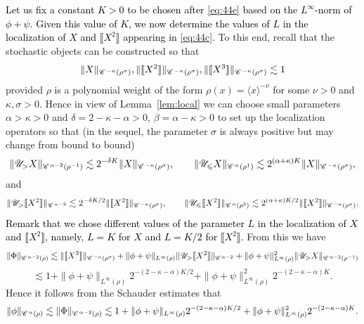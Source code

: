 \documentclass[a4paper,11pt]{article}
\numberwithin{equation}{section}
\newcommand{\CC}{\mathscr{C} \hspace{.1em}}
\newcommand{\UU}{\mathscr{U}}
\newcommand{\rmbb}[1]{\textcolor{black}{#1}}
\newcommand{\8}{\infty}
\begin{document}
 \rmbb{Let us fix a constant $K>0$ to be chosen  after \eqref{eq:44e} based on the $L^{\infty}$-norm of $\phi+\psi$. Given this value of $K$, we  now determine the values of $L$ in the localization of $X$ and $\llbracket X^{2}\rrbracket$ appearing in \eqref{eq:44c}.}
To this end, recall that the stochastic objects can be constructed so that
$$
\|X\|_{\CC^{-\kappa}(\rho^\sigma)},\|\llbracket X^2 \rrbracket\|_{\CC^{-\kappa}(\rho^\sigma)},\|\llbracket X^3 \rrbracket\|_{\CC^{-\kappa}(\rho^\sigma)}\lesssim 1
$$
provided $\rho$ is a polynomial weight of the form $\rho(x)=\langle x\rangle^{-\nu}$ for some $\nu>0$ and $\kappa,\sigma>0$. 
Hence in view of Lemma~\ref{lem:local} we can choose small parameters $\alpha>\kappa>0$ and $\delta=2-\kappa-\alpha>0$, $\beta=\alpha-\kappa>0$ to set up the localization operators so that (in the sequel, the parameter $\sigma$ is always positive but may change from bound to bound)
$$
\| \UU_{>} X \|_{\CC^{\alpha-2} (\rho^{- 1})} \lesssim 2^{- \delta K}\|X\|_{\CC^{-\kappa}(\rho^\sigma)},
   \qquad \| \UU_{\leqslant} X \|_{\CC^{\alpha} (\rho^{1})}
   \lesssim 2^{(\alpha+\kappa) K}\|X\|_{\CC^{-\kappa}(\rho^\sigma)},
$$
and
\[ \| \UU_{>} \llbracket X^2 \rrbracket \|_{\CC^{\alpha-2}} \lesssim
   2^{- \delta K/2}\|\llbracket X^2 \rrbracket\|_{\CC^{-\kappa}(\rho^\sigma)}, \qquad \| \UU_{\leqslant} \llbracket X^2 \rrbracket
   \|_{\CC^{\alpha} (\rho^{2 })} \lesssim 2^{(\alpha+\kappa) K/2}\|\llbracket X^2 \rrbracket\|_{\CC^{-\kappa}(\rho^\sigma)}. \]
\rmbb{Remark that we chose different values of the parameter $L$ in the localization of $X$ and $\llbracket X^{2}\rrbracket$, namely, $L=K$ for $X$ and $L=K/2$ for $\llbracket X^{2}\rrbracket$.}
From this we have
$$
\| \Phi \|_{\CC^{\alpha - 2} (\rho)} \lesssim \|\llbracket X^3 \rrbracket\|_{\CC^{-\kappa}(\rho^\sigma)} + \|\phi+\psi\|_{L^\infty(\rho)}\| \UU_{>} \llbracket X^2 \rrbracket \|_{\CC^{\alpha - 2}}+\|\phi+\psi\|_{L^\infty(\rho)}^2\| \UU_{>} X \|_{\CC^{\alpha - 2} (\rho^{- 1})}
$$
$$
\lesssim 1+ \|\phi+\psi\|_{L^\infty(\rho)} 2^{-(2-\kappa-\alpha)K/2}+\|\phi+\psi\|_{L^\infty(\rho)}^2 2^{-(2-\kappa-\alpha)K}.
$$
Hence it follows from the Schauder estimates that
\begin{equation}\label{eq:44e}
\|\phi\|_{\CC^\alpha(\rho)}\lesssim \| \Phi \|_{\CC^{\alpha - 2} (\rho)} \lesssim 1+  \|\phi+\psi\|_{L^\infty(\rho)} 2^{-(2-\kappa-\alpha)K/2}+\|\phi+\psi\|_{L^\infty(\rho)}^2 2^{-(2-\kappa-\alpha)K}.
\end{equation}
\end{document}

